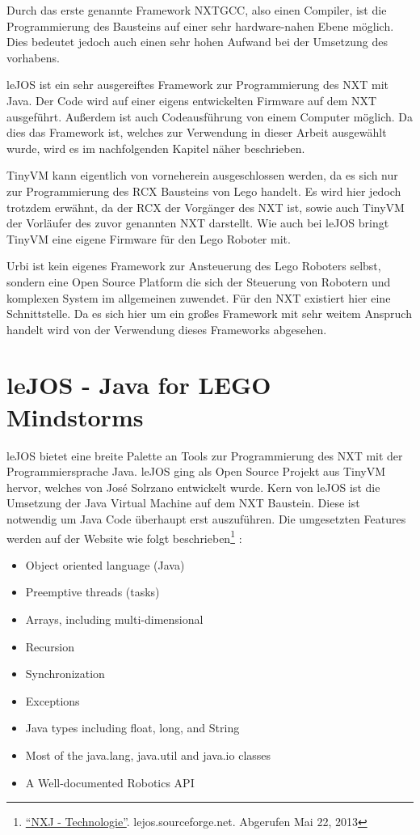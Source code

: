 Durch das erste genannte Framework NXTGCC, also einen Compiler, ist die Programmierung des Bausteins auf einer sehr hardware-nahen Ebene m\"oglich. Dies bedeutet jedoch auch einen sehr hohen Aufwand bei der Umsetzung des vorhabens.
\par\smallskip
leJOS ist ein sehr ausgereiftes Framework zur Programmierung des NXT mit Java. Der Code wird auf einer eigens entwickelten Firmware auf dem NXT ausgef\"uhrt. Außerdem ist auch Codeausf\"uhrung von einem Computer m\"oglich. Da dies das Framework ist, welches zur Verwendung in dieser Arbeit ausgew\"ahlt wurde, wird es im nachfolgenden Kapitel n\"aher beschrieben.
\par\smallskip
TinyVM kann eigentlich von vorneherein ausgeschlossen werden, da es sich nur zur Programmierung des RCX Bausteins von Lego handelt. Es wird hier jedoch trotzdem erw\"ahnt, da der RCX der Vorg\"anger des NXT ist, sowie auch TinyVM der Vorl\"aufer des zuvor genannten NXT darstellt. Wie auch bei leJOS bringt TinyVM eine eigene Firmware f\"ur den Lego Roboter mit.
\par\smallskip
Urbi ist kein eigenes Framework zur Ansteuerung des Lego Roboters selbst, sondern eine Open Source Platform die sich der Steuerung von Robotern und komplexen System im allgemeinen zuwendet. F\"ur den NXT existiert hier eine Schnittstelle. Da es sich hier um ein großes Framework mit sehr weitem Anspruch handelt wird von der Verwendung dieses Frameworks abgesehen.

\section{leJOS - Java for LEGO Mindstorms}

leJOS bietet eine breite Palette an Tools zur Programmierung des NXT mit der Programmiersprache Java. leJOS ging als Open Source Projekt aus TinyVM hervor, welches von Jos\'e Solrzano entwickelt wurde. Kern von leJOS ist die Umsetzung der Java Virtual Machine auf dem NXT Baustein. Diese ist notwendig um Java Code \"uberhaupt erst auszuf\"uhren. Die umgesetzten Features werden auf der Website wie folgt beschrieben\footnote{\href{http://lejos.sourceforge.net/nxj.php}{\enquote{NXJ - Technologie}}. lejos.sourceforge.net. Abgerufen Mai 22, 2013} :

\begin{itemize}
  \item Object oriented language (Java)
  \item Preemptive threads (tasks)
  \item Arrays, including multi-dimensional
  \item Recursion
  \item Synchronization
  \item Exceptions
  \item Java types including float, long, and String
  \item Most of the java.lang, java.util and java.io classes
  \item A Well-documented Robotics API
\end{itemize}


